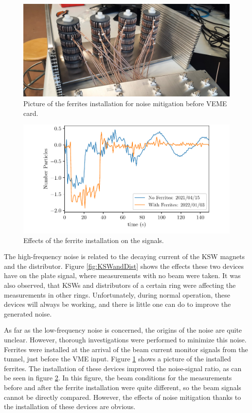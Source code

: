 \begin{figure}[h]
    \centering
    \includegraphics[width=0.7\columnwidth]{Figure_Ferrites/PictureFerrites.jpg}
    \caption{Picture of the ferrites installation for noise mitigation before \hzhm VEME card. }
    \label{fig:Ferrites}
\end{figure}

\begin{figure}[h]
    \centering
    \includegraphics[width=1.0\columnwidth]{Figure_FerritesEffect/BfreAfter.pdf}
    \caption{Effects of the ferrite installation on the \hzhm signals. }
    \label{fig:BefAftFerrites}
\end{figure}


The high-frequency noise is related to the decaying current of the KSW magnets and the distributor. Figure \ref{fig:KSWandDist} shows the effects these two devices have on the plate signal, where measurements with no beam were taken. It was also observed, that KSWs and distributors of a certain ring were affecting the measurements in other rings. Unfortunately, during normal operation, these devices will always be working, and there is little one can do to improve the generated noise. 

As far as the low-frequency noise is concerned, the origins of the noise are quite unclear. However, thorough investigations were performed to minimize this noise. Ferrites \parencite[][]{ref:Ferrites} were installed at the arrival of the \hzhm beam current monitor signals from the tunnel, just before the VME input. Figure \ref{fig:Ferrites} shows a picture of the installed ferrites. The installation of these devices improved the noise-signal ratio, as can be seen in figure \ref{fig:BefAftFerrites}. In this figure, the beam conditions for the measurements before and after the ferrite installation were quite different, so the beam signals cannot be directly compared. However, the effects of noise mitigation thanks to the installation of these devices are obvious. 
